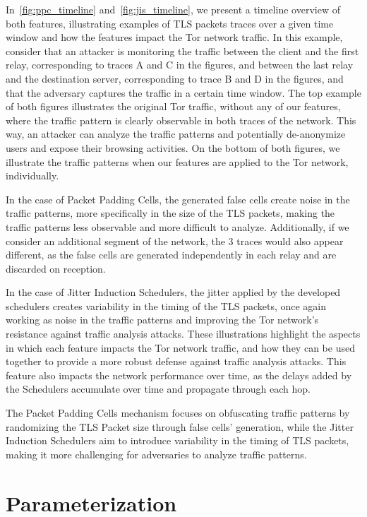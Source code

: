 In~\autoref{fig:ppc_timeline} and~\autoref{fig:jis_timeline}, we present a timeline overview of both features, illustrating examples of TLS packets traces over a given time window and how the features impact the Tor network traffic. In this example, consider that an attacker is monitoring the traffic between the client and the first relay, corresponding to traces A and C in the figures, and between the last relay and the destination server, corresponding to trace B and D in the figures, and that the adversary captures the traffic in a certain time window. The top example of both figures illustrates the original Tor traffic, without any of our features, where the traffic pattern is clearly observable in both traces of the network. This way, an attacker can analyze the traffic patterns and potentially de-anonymize users and expose their browsing activities. On the bottom of both figures, we illustrate the traffic patterns when our features are applied to the Tor network, individually. 

In the case of Packet Padding Cells, the generated false cells create noise in the traffic patterns, more specifically in the size of the TLS packets, making the traffic patterns less observable and more difficult to analyze. Additionally, if we consider an additional segment of the network, the 3 traces would also appear different, as the false cells are generated independently in each relay and are discarded on reception.

In the case of Jitter Induction Schedulers, the jitter applied by the developed schedulers creates variability in the timing of the TLS packets, once again working as noise in the traffic patterns and improving the Tor network's resistance against traffic analysis attacks. These illustrations highlight the aspects in which each feature impacts the Tor network traffic, and how they can be used together to provide a more robust defense against traffic analysis attacks. This feature also impacts the network performance over time, as the delays added by the Schedulers accumulate over time and propagate through each hop.

The Packet Padding Cells mechanism focuses on obfuscating traffic patterns by randomizing the TLS Packet size through false cells' generation, while the Jitter Induction Schedulers aim to introduce variability in the timing of TLS packets, making it more challenging for adversaries to analyze traffic patterns.

\section{Parameterization}\label{sec:parameterization}

